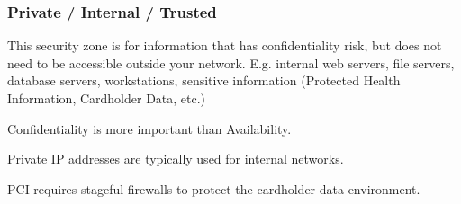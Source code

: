 \subsubsection{Private / Internal / Trusted}
\begin{description}
\item This security zone is for information that has confidentiality risk, but does not need to be accessible outside your network. E.g. internal web servers, file servers, database servers, workstations, sensitive information (Protected Health Information, Cardholder Data, etc.)
\item Confidentiality is more important than Availability.
\item Private IP addresses are typically used for internal networks.
\item PCI requires stageful firewalls to protect the cardholder data environment.
\end{description}

